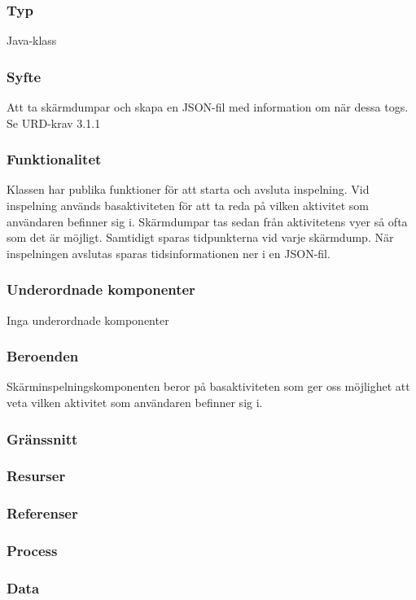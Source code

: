 \subsubsection{Typ}
Java-klass
\subsubsection{Syfte}
Att ta skärmdumpar och skapa en JSON-fil med information om när dessa togs.
Se URD-krav 3.1.1
\subsubsection{Funktionalitet}
Klassen har publika funktioner för att starta och avsluta inspelning. Vid inspelning används basaktiviteten för att ta reda på vilken aktivitet som användaren befinner sig i. Skärmdumpar tas sedan från aktivitetens vyer så ofta som det är möjligt. Samtidigt sparas tidpunkterna vid varje skärmdump. När inspelningen avslutas sparas tidsinformationen ner i en JSON-fil.
\subsubsection{Underordnade komponenter}
Inga underordnade komponenter
\subsubsection{Beroenden}
Skärminspelningskomponenten beror på basaktiviteten som ger oss möjlighet att veta vilken aktivitet som användaren befinner sig i.
\subsubsection{Gränssnitt}

\subsubsection{Resurser}

\subsubsection{Referenser}

\subsubsection{Process}

\subsubsection{Data}
